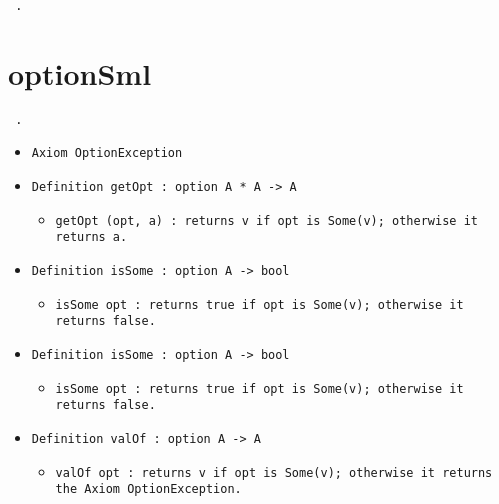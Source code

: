 \documentclass[11pt]{report}
\begin{document}
\begin{coqdoccode}
\coqdocemptyline
\coqdocemptyline
\coqdocnoindent
\texttt{ .\coqdoceol}
\coqdocemptyline
\end{coqdoccode}
\section*{optionSml}

\begin{coqdoccode}
\coqdocnoindent
\texttt{ .\coqdoceol}
\coqdocemptyline
\end{coqdoccode}



\begin{itemize}
\item  \texttt{Axiom OptionException}



\item  \texttt{Definition getOpt : option A * A -> A}

\begin{itemize}
\item  \texttt{getOpt (opt, a) : returns v if opt is Some(v); otherwise it returns a.}
\end{itemize}

\item  \texttt{Definition isSome : option A -> bool}

\begin{itemize}
\item  \texttt{isSome opt : returns true if opt is Some(v); otherwise it returns false.}
\end{itemize}

\item  \texttt{Definition isSome : option A -> bool}

\begin{itemize}
\item  \texttt{isSome opt : returns true if opt is Some(v); otherwise it returns false.}
\end{itemize}

\item  \texttt{Definition valOf : option A -> A}

\begin{itemize}
\item \begin{flushleft} \texttt{valOf opt : returns v if opt is Some(v); otherwise it returns the Axiom OptionException.} \end{flushleft}
\end{itemize}


\end{itemize}
\end{document}
